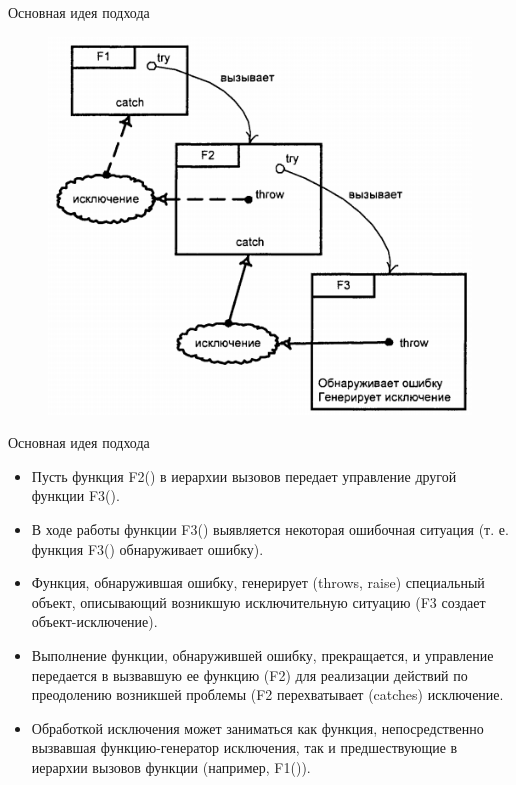 \documentclass{beamer}
\begin{document}
\begin{frame}{Основная идея подхода}
\begin{figure}[h]
\centering
\includegraphics[scale=0.6]{images/lec08-pic06.png}
\end{figure}
\end{frame}

\begin{frame}{Основная идея подхода}
\begin{itemize}
\item Пусть функция F2() в иерархии вызовов передает управление другой функции F3(). 
\item В ходе работы функции F3() выявляется некоторая ошибочная ситуация (т. е. функция F3() обнаруживает ошибку). 
\item Функция, обнаружившая ошибку, генерирует (throws, raise) специальный объект, описывающий возникшую исключительную ситуацию (F3 создает объект-исключение). 
\item Выполнение функции, обнаружившей ошибку, прекращается, и управление передается в вызвавшую ее функцию (F2) для реализации действий по преодолению возникшей проблемы (F2 перехватывает (catches) исключение. 
\item Обработкой исключения может заниматься как функция, непосредственно вызвавшая функцию-генератор исключения, так и предшествующие в иерархии вызовов функции (например, F1()).
\end{itemize}
\end{frame}
\end{document}
